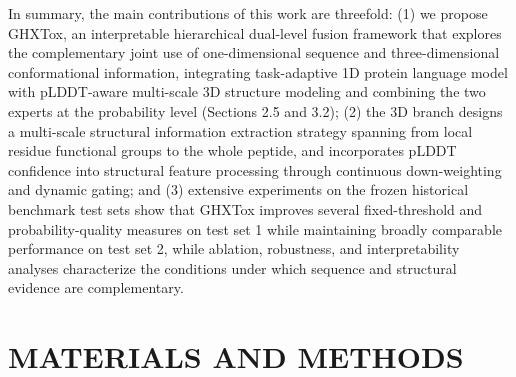 \documentclass[12pt]{article}
\begin{document}
In summary, the main contributions of this work are threefold: (1) we propose
GHXTox, an interpretable hierarchical dual-level fusion framework that
explores the complementary joint use of one-dimensional sequence and
three-dimensional conformational information, integrating task-adaptive 1D
protein language model with pLDDT-aware multi-scale 3D structure modeling and
combining the two experts at the probability level (Sections 2.5 and 3.2); (2) the 3D branch designs a multi-scale structural
information extraction strategy spanning from local residue functional groups
to the whole peptide, and incorporates pLDDT confidence into structural
feature processing through continuous down-weighting and dynamic gating; and
(3) extensive experiments on the frozen historical benchmark test sets show
that GHXTox improves several fixed-threshold and probability-quality measures
on test set 1 while maintaining broadly comparable performance on test set 2, while
ablation, robustness, and interpretability analyses characterize the
conditions under which sequence and structural evidence are complementary.

\section{MATERIALS AND METHODS}
\end{document}
